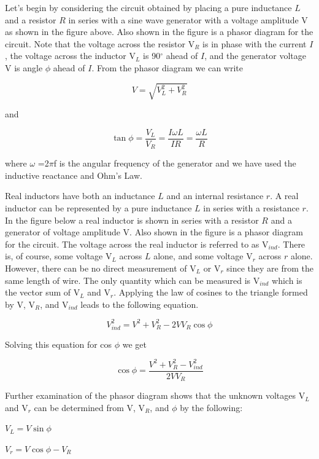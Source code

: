 Let's begin by considering the circuit obtained by placing a pure
inductance $L$ and a resistor $R$ in series with a sine wave generator
with a voltage amplitude V as shown in the figure above. Also shown
in the figure is a phasor diagram for the circuit. Note that the voltage
across the resistor V\( _{R} \) is in phase with the current $I$, the
voltage across the inductor V\( _{L} \) is 90\( ^{\circ } \) ahead
of $I$, and the generator voltage V is angle \( \phi  \) ahead of $I$.
From the phasor diagram we can write 

\[
V=\sqrt{V_{L}^{2}+V_{R}^{2}}\]


and 

\[
\tan \phi =\frac{V_{L}}{V_{R}}=\frac{I\omega L}{IR}=\frac{\omega L}{R}\]


where \( \omega  \) =2\( \pi  \)f is the angular frequency of
the generator and we have used the inductive reactance and Ohm's Law.

Real inductors have both an inductance $L$ and an internal resistance
$r$. A real inductor can be represented by a pure inductance $L$ in series
with a resistance $r$. In the figure below a real inductor is shown
in series with a resistor $R$ and a generator of voltage amplitude V.
Also shown in the figure is a phasor diagram for the circuit. The
voltage across the real inductor is referred to as V\( _{ind} \).
There is, of course, some voltage V\( _{L} \) across $L$ alone, and
some voltage V\( _{r} \) across $r$ alone. However, there can be no
direct measurement of V\( _{L} \) or V\( _{r} \) since they are from the
same length of wire. The only quantity
which can be measured is V\( _{ind} \) which is the vector sum of
V\( _{L} \) and V\( _{r} \). Applying the law of cosines to the
triangle formed by V, V\( _{R} \), and V\( _{ind} \) leads to the
following equation.

\[
V_{ind}^{2}=V^{2}+V_{R}^{2}-2VV_{R}\cos \phi \]


Solving this equation for cos \( \phi  \) we get

\[
\cos \phi =\frac{V^{2}+V_{R}^{2}-V_{ind}^{2}}{2VV_{R}}\]


Further examination of the phasor diagram shows that the unknown voltages
V\( _{L} \) and V\( _{r} \) can be determined from V, V\( _{R} \),
and \( \phi  \) by the following: 

{\centering \( V_{L}=V\sin \phi  \) \par}

{\centering \( V_{r}=V\cos \phi -V_{R} \)\par}

